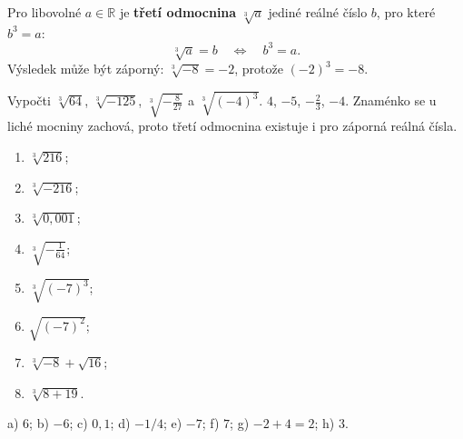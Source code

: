 \documentclass[11pt,a4paper]{article}
\begin{document}
\begin{definiceBox}[title={Definice - Třetí odmocnina}]
Pro libovolné $a\in\mathbb R$ je \textbf{třetí odmocnina} $\sqrt[3]{a}$
jediné reálné číslo $b$, pro které $b^3=a$:
\[
\boxed{\sqrt[3]{a}=b\quad\Longleftrightarrow\quad b^3=a.}
\]
Výsledek může být záporný: $\sqrt[3]{-8}=-2$, protože $(-2)^3=-8$.
\end{definiceBox}
\begin{prikladReseniBox}[title={Příklad 2}]
Vypočti $\sqrt[3]{64}$, $\sqrt[3]{-125}$,
$\sqrt[3]{-\frac8{27}}$ a $\sqrt[3]{(-4)^3}$.
\tcblower
$4$, $-5$, $-\frac23$, $-4$.
Znaménko se u liché mocniny zachová, proto třetí odmocnina existuje
i pro záporná reálná čísla.
\end{prikladReseniBox}
\begin{zadaniReseniBox}[title={Samostatná práce 2}]
\begin{enumerate}[label=\alph*)]
\item $\sqrt[3]{216}$; \item $\sqrt[3]{-216}$;
\item $\sqrt[3]{0{,}001}$; \item $\sqrt[3]{-\frac1{64}}$;
\item $\sqrt[3]{(-7)^3}$; \item $\sqrt{(-7)^2}$;
\item $\sqrt[3]{-8}+\sqrt{16}$;
\item $\sqrt[3]{8+19}$.
\end{enumerate}
\tcblower
 a) $6$; b) $-6$; c) $0{,}1$; d) $-1/4$;
 e) $-7$; f) $7$; g) $-2+4=2$; h) $3$.
\end{zadaniReseniBox}
\end{document}
